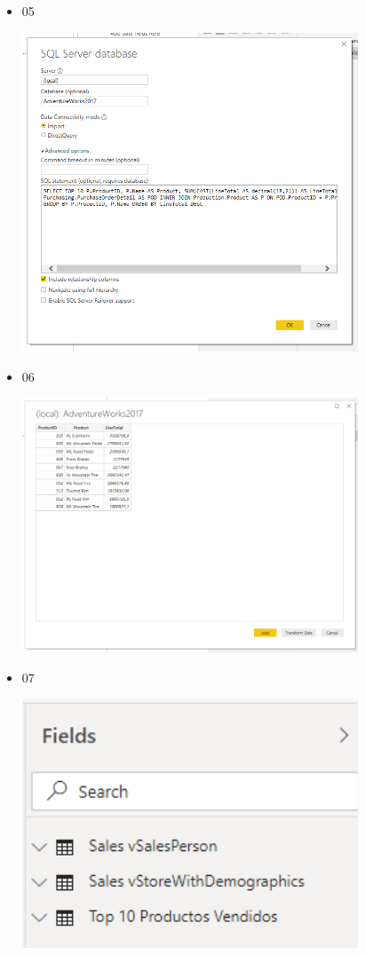 \begin{itemize}
	\item 05
	\begin{center}
	\includegraphics[width=10cm]{./Imagenes/5} 
	\end{center}
\end{itemize} 

\begin{itemize}
	\item 06
	\begin{center}
	\includegraphics[width=10cm]{./Imagenes/6} 
	\end{center}
\end{itemize} 

\begin{itemize}
	\item 07
	\begin{center}
	\includegraphics[width=10cm]{./Imagenes/7} 
	\end{center}
\end{itemize} 

